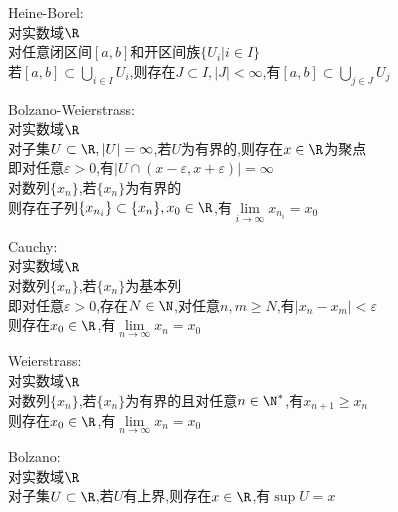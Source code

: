 \begin{dingli}
Heine-Borel:\\
对实数域$\R$\\
对任意闭区间$[a,b]$和开区间族$\{U_{i}|i\in I\}$\\
若$[a,b]\subset \bigcup\limits_{i\in I}U_{i}$,则存在$J\subset I,|J|<\infty$,有$[a,b]\subset \bigcup\limits_{j\in J}U_{j}$
\end{dingli}

\begin{dingli}
Bolzano-Weierstrass:\\
对实数域$\R$\\
对子集$U\subset \R,|U|=\infty$,若$U$为有界的,则存在$x\in\R$为聚点\\
即对任意$\varepsilon>0$,有$|U\cap (x-\varepsilon,x+\varepsilon)|=\infty$\\
对数列$\{x_n\}$,若$\{x_n\}$为有界的\\
则存在子列$\{x_{n_i}\}\subset\{x_n\},x_0\in\R$,有$\lim\limits_{i\to\infty}x_{n_{i}}=x_{0}$
\end{dingli}

\begin{dingli}
Cauchy:\\
对实数域$\R$\\
对数列$\{x_n\}$,若$\{x_n\}$为基本列\\
即对任意$\varepsilon>0$,存在$N\in \N$,对任意$n,m\geq N$,有$|x_n-x_m|<\varepsilon$\\
则存在$x_0\in \R$,有$\lim\limits_{n\to\infty}x_n=x_0$
\end{dingli}

\begin{dingli}
Weierstrass:\\
对实数域$\R$\\
对数列$\{x_n\}$,若$\{x_n\}$为有界的且对任意$n\in \N^*$,有$x_{n+1}\geq x_{n}$\\
则存在$x_0\in \R$,有$\lim\limits_{n\to\infty}x_n=x_0$
\end{dingli}

\begin{dingli}
Bolzano:\\
对实数域$\R$\\
对子集$U\subset\R$,若$U$有上界,则存在$x\in \R$,有$\sup U=x$
\end{dingli}


